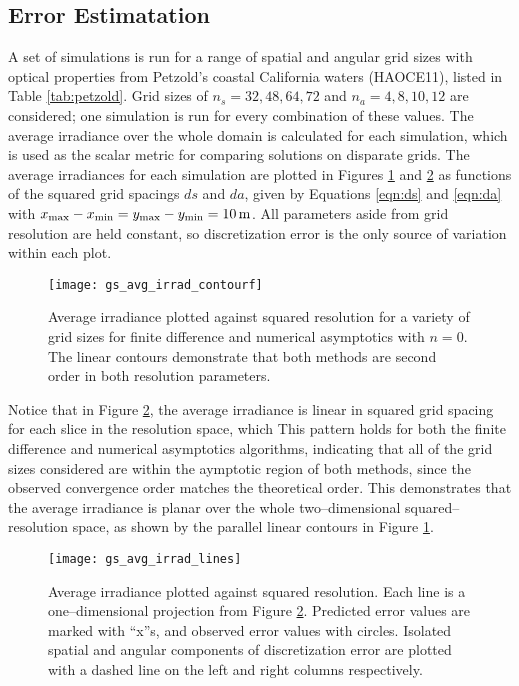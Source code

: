 \subsection{Error Estimatation}
A set of simulations is run for a range of spatial and angular grid sizes with optical properties from Petzold's coastal California waters (HAOCE11), listed in Table \ref{tab:petzold}.
Grid sizes of $n_s=32,48,64,72$ and $n_a=4,8,10,12$ are considered; one simulation is run for every combination of these values.
The average irradiance over the whole domain is calculated for each simulation, which is used as the scalar metric for comparing solutions on disparate grids.
The average irradiances for each simulation are plotted in Figures \ref{fig:gs_avg_irrad_contourf} and \ref{fig:gs_avg_irrad_lines} as functions of the squared grid spacings $ds$ and $da$, given by Equations \eqref{eqn:ds} and \eqref{eqn:da} with $\xmax-\xmin = \ymax-\ymin = \SI{10}{\m}$.
All parameters aside from grid resolution are held constant, so discretization error is the only source of variation within each plot.

\begin{figure}[H]
  \centering
  \texttt{[image: gs\_avg\_irrad\_contourf]}
  \caption{Average irradiance plotted against squared resolution for a variety of grid sizes for finite difference and numerical asymptotics with $n=0$. The linear contours demonstrate that both methods are second order in both resolution parameters.}
  \label{fig:gs_avg_irrad_contourf}
\end{figure}

Notice that in Figure \ref{fig:gs_avg_irrad_lines}, the average irradiance is linear in squared grid spacing for each slice in the resolution space, which 
This pattern holds for both the finite difference and numerical asymptotics algorithms, indicating that all of the grid sizes considered are within the aymptotic region of both methods, since the observed convergence order matches the theoretical order.
This demonstrates that the average irradiance is planar over the whole two--dimensional squared--resolution space, as shown by the parallel linear contours in Figure \ref{fig:gs_avg_irrad_contourf}.


\begin{figure}[H]
  \centering
  \texttt{[image: gs\_avg\_irrad\_lines]}
  \caption{Average irradiance plotted against squared resolution. Each line is a one--dimensional projection from Figure \ref{fig:gs_avg_irrad_lines}. Predicted error values are marked with ``x''s, and observed error values with circles. Isolated spatial and angular components of discretization error are plotted with a dashed line on the left and right columns respectively.}
  \label{fig:gs_avg_irrad_lines}
\end{figure}



